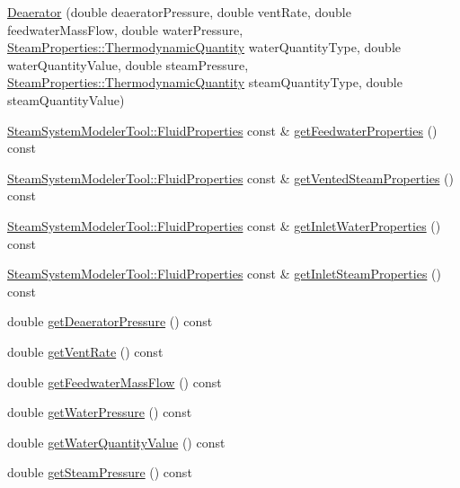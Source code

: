 \begin{DoxyCompactItemize}
\item 
\hyperlink{class_deaerator_a02311c34cbe46384187292e5f844984c}{Deaerator} (double deaerator\+Pressure, double vent\+Rate, double feedwater\+Mass\+Flow, double water\+Pressure, \hyperlink{class_steam_properties_ae0294bedf7d178c2d8fb6aed0f62fbff}{Steam\+Properties\+::\+Thermodynamic\+Quantity} water\+Quantity\+Type, double water\+Quantity\+Value, double steam\+Pressure, \hyperlink{class_steam_properties_ae0294bedf7d178c2d8fb6aed0f62fbff}{Steam\+Properties\+::\+Thermodynamic\+Quantity} steam\+Quantity\+Type, double steam\+Quantity\+Value)
\item 
\hyperlink{struct_steam_system_modeler_tool_1_1_fluid_properties}{Steam\+System\+Modeler\+Tool\+::\+Fluid\+Properties} const  \& \hyperlink{class_deaerator_ab2ab900e36c86e48ad92c4013c471d6b}{get\+Feedwater\+Properties} () const
\item 
\hyperlink{struct_steam_system_modeler_tool_1_1_fluid_properties}{Steam\+System\+Modeler\+Tool\+::\+Fluid\+Properties} const  \& \hyperlink{class_deaerator_a576a4632452268f77839334d87d5abff}{get\+Vented\+Steam\+Properties} () const
\item 
\hyperlink{struct_steam_system_modeler_tool_1_1_fluid_properties}{Steam\+System\+Modeler\+Tool\+::\+Fluid\+Properties} const  \& \hyperlink{class_deaerator_a9138c93cf6643e91ad7ce0de7fb328b7}{get\+Inlet\+Water\+Properties} () const
\item 
\hyperlink{struct_steam_system_modeler_tool_1_1_fluid_properties}{Steam\+System\+Modeler\+Tool\+::\+Fluid\+Properties} const  \& \hyperlink{class_deaerator_a7298fa1e4930e73dd5340411e8ccff33}{get\+Inlet\+Steam\+Properties} () const
\item 
double \hyperlink{class_deaerator_ac16cacdeef74e45f951fe992bac4e9e3}{get\+Deaerator\+Pressure} () const
\item 
double \hyperlink{class_deaerator_ad0262491c2bd9a6f820eaaba54498bcd}{get\+Vent\+Rate} () const
\item 
double \hyperlink{class_deaerator_ae1524e8b406c3d5c2823ae4e6bafe389}{get\+Feedwater\+Mass\+Flow} () const
\item 
double \hyperlink{class_deaerator_ae86ef305a8641d61ec76bd39bb84f28b}{get\+Water\+Pressure} () const
\item 
double \hyperlink{class_deaerator_a9362430fb04802b6f14c9bf09d62a466}{get\+Water\+Quantity\+Value} () const
\item 
double \hyperlink{class_deaerator_aebe779c63cace193d040f497e3b70728}{get\+Steam\+Pressure} () const
\item 

\end{DoxyCompactItemize}
